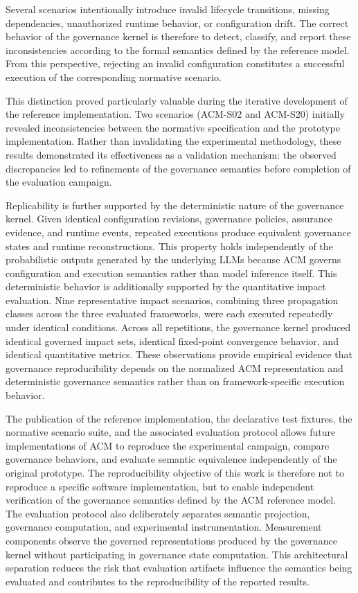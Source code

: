 \documentclass[10pt]{article}
\begin{document}
Several scenarios intentionally introduce invalid lifecycle transitions, missing dependencies, unauthorized runtime behavior, or configuration drift. The correct behavior of the governance kernel is therefore to detect, classify, and report these inconsistencies according to the formal semantics defined by the reference model. From this perspective, rejecting an invalid configuration constitutes a successful execution of the corresponding normative scenario.

This distinction proved particularly valuable during the iterative development of the reference implementation. Two scenarios (ACM-S02 and ACM-S20) initially revealed inconsistencies between the normative specification and the prototype implementation. Rather than invalidating the experimental methodology, these results demonstrated its effectiveness as a validation mechanism: the observed discrepancies led to refinements of the governance semantics before completion of the evaluation campaign.

Replicability is further supported by the deterministic nature of the
governance kernel. Given identical configuration revisions, governance policies, assurance evidence, and runtime events, repeated executions produce equivalent governance states and runtime reconstructions. 
This property holds independently of the probabilistic outputs generated by the underlying LLMs because ACM governs configuration and execution semantics rather than model inference itself. This deterministic behavior is additionally supported by the quantitative impact evaluation. Nine representative impact scenarios, combining three propagation classes across the three evaluated frameworks, were each executed repeatedly under identical conditions. Across all repetitions, the governance kernel produced identical governed impact sets, identical fixed-point convergence behavior, and identical quantitative metrics. These observations provide empirical evidence that governance reproducibility depends on the normalized ACM representation and deterministic governance semantics rather than on framework-specific execution behavior.

The publication of the reference implementation, the declarative test
fixtures, the normative scenario suite, and the associated evaluation protocol allows future implementations of ACM to reproduce the experimental campaign, compare governance behaviors, and evaluate semantic equivalence independently of the original prototype. The reproducibility objective of this work is therefore not to reproduce a specific software implementation, but to enable independent verification of the governance semantics defined by the ACM reference model.
The evaluation protocol also deliberately separates semantic projection, governance computation, and experimental instrumentation. Measurement components observe the governed representations produced by the governance kernel without participating in governance state computation. This architectural separation reduces the risk that evaluation artifacts influence the semantics being evaluated and contributes to the reproducibility of the reported results.
\end{document}
